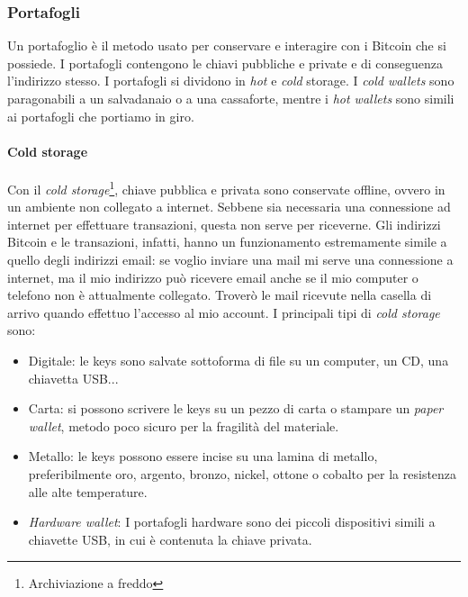 \documentclass {article}
\begin{document}
\subsubsection {Portafogli}


Un portafoglio è il metodo usato per conservare e interagire con i Bitcoin che si possiede.
I portafogli contengono le chiavi pubbliche e private e di conseguenza l'indirizzo stesso.
I portafogli si dividono in \textit{hot} e \textit{cold} storage.
I \textit{cold wallets} sono paragonabili a un salvadanaio o a una cassaforte, mentre i \textit{hot wallets} sono simili ai portafogli che portiamo in giro.

\paragraph {Cold storage}

Con il \textit{cold storage}\footnote{Archiviazione a freddo}, chiave pubblica e privata sono conservate offline, ovvero in un ambiente non collegato a internet.
Sebbene sia necessaria una connessione ad internet per effettuare transazioni, questa non serve per riceverne.
Gli indirizzi Bitcoin e le transazioni, infatti, hanno un funzionamento estremamente simile a quello degli indirizzi email: se voglio inviare una mail mi serve una connessione a internet, ma il mio indirizzo può ricevere email anche se il mio computer o telefono non è attualmente collegato.
Troverò le mail ricevute nella casella di arrivo quando effettuo l'accesso al mio account.
I principali tipi di \textit{cold storage} sono:

\begin{itemize}
\item Digitale: le keys sono salvate sottoforma di file su un computer, un CD, una chiavetta USB...
\item Carta: si possono scrivere le keys su un pezzo di carta o stampare un \textit{paper wallet}, metodo poco sicuro per la fragilità del materiale.
\item Metallo: le keys possono essere incise su una lamina di metallo, preferibilmente oro, argento, bronzo, nickel, ottone o cobalto per la resistenza alle alte temperature.
\item \textit{Hardware wallet}: I portafogli hardware sono dei piccoli dispositivi simili a chiavette USB, in cui è contenuta la chiave privata.
\end{itemize}
\end{document}
